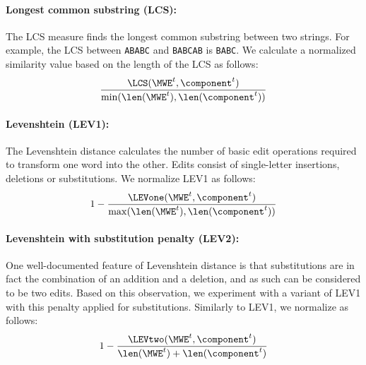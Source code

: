 \documentclass[output=paper
,modfonts
,nonflat]{langsci/langscibook}
\begin{document}
\paragraph*{Longest common substring (LCS):}

The LCS measure finds the longest common substring between two
strings. For example, the LCS between \texttt{ABABC} and \texttt{BABCAB}
is \texttt{BABC}. We calculate a normalized similarity value based on
the length of the LCS as follows:
\begin{eqnarray*}
\frac{\LCS(\MWE^t,\component^t)}{\min(\len(\MWE^t),\len(\component^t))}
\end{eqnarray*}


\paragraph*{Levenshtein (LEV1):}
The Levenshtein distance calculates the number of basic edit
operations required to transform one word into the other. Edits
consist of single-letter insertions, deletions or substitutions. We
normalize LEV1 as follows:
\begin{eqnarray*}
 1 - \frac{\LEVone(\MWE^t,\component^t)}{\max(\len(\MWE^t),\len(\component^t))}
\end{eqnarray*}

\paragraph*{Levenshtein with substitution penalty (LEV2):}
One well-documented feature of Levenshtein distance
\citep{Baldwin:2009c} is that substitutions are in fact the
combination of an addition and a deletion, and as such can be
considered to be two edits. Based on this observation, we experiment
with a variant of LEV1 with this penalty applied for
substitutions. Similarly to LEV1, we normalize as follows:
\begin{eqnarray*}
 1-  \frac{\LEVtwo(\MWE^t,\component^t)}{\len(\MWE^t)+\len(\component^t)}
\end{eqnarray*}
\end{document}

